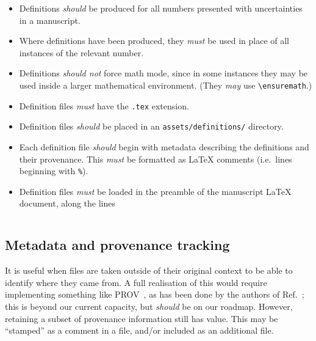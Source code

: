 \documentclass{article}
\newcommand\rfcword[1]{\emph{#1}\xspace}
\newcommand\must{\rfcword{must}}
\newcommand\should{\rfcword{should}}
\newcommand\shouldnot{\rfcword{should not}}
\newcommand\may{\rfcword{may}}
\newcommand\filename[1]{\texttt{#1}\xspace}
\begin{document}
\begin{itemize}
  \item
        Definitions \should be produced for all numbers presented with uncertainties in a manuscript.
  \item
        Where definitions have been produced,
        they \must be used in place of all instances of the relevant number.
  \item
        Definitions \shouldnot force math mode,
        since in some instances they may be used inside a larger mathematical environment.
        (They \may use \verb|\ensuremath|.)
  \item
        Definition files \must have the \filename{.tex} extension.
  \item
        Definition files \should be placed in an \filename{assets/definitions/} directory.
  \item
        Each definition file \should begin with metadata describing the definitions and their provenance.
        This \must be formatted as LaTeX comments
        (i.e.\ lines beginning with \verb|%|).
  \item
        Definition files \must be loaded in the preamble of the manuscript LaTeX document,
        along the lines
\begin{verbatim}

\end{verbatim}
\end{itemize}

\subsection{Metadata and provenance tracking}

It is useful
when files are taken outside of their original context
to be able to identify where they came from.
A full realisation of this would require implementing something like PROV~\cite{prov},
as has been done by the authors of Ref.~\cite{Auge:2023vnd};
this is beyond our current capacity,
but \should be on our roadmap.
However,
retaining a subset of provenance information still has value.
This may be ``stamped'' as a comment in a file,
and/or included as an additional file.
\end{document}
